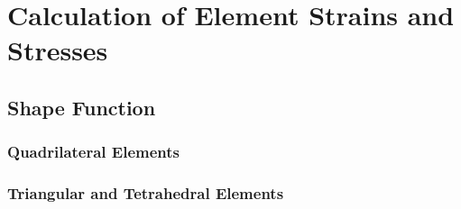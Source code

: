 \chapter{Calculation of Element Strains and Stresses} \label{ch:StandDerForschung}
\section{Shape Function}
\subsection{Quadrilateral Elements}
\subsection{Triangular and Tetrahedral Elements}


